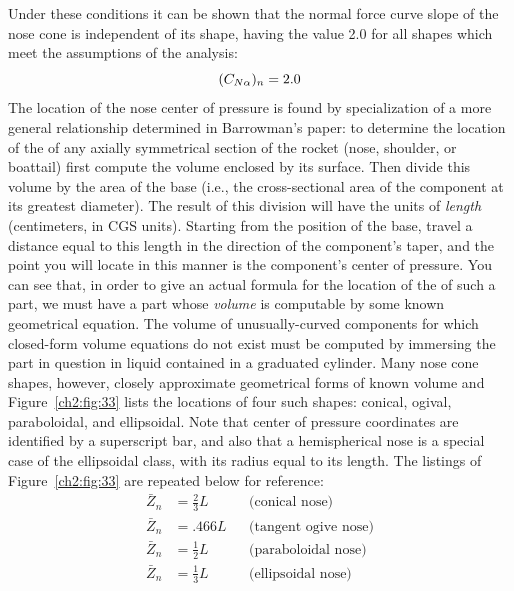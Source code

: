 Under these conditions it can be shown that the normal force curve slope of
the nose cone is independent of its shape, having the value 2.0 for all
shapes which meet the assumptions of the analysis:
\begin{equation}\label{ch2:eq:79}
(C_{N\alpha})_n = 2.0
\end{equation}
The location of the nose center of pressure is found by specialization of a
more general relationship determined in Barrowman's paper: to determine the
location of the \CP{} of any axially symmetrical section of the rocket
(nose, shoulder, or boattail) first compute the volume enclosed by its
surface. Then divide this volume by the area of the base (i.e., the
cross-sectional area of the component at its greatest diameter). The result
of this division will have the units of \emph{length} (centimeters, in CGS
units). Starting from the position of the base, travel a distance equal to
this length in the direction of the component's taper, and the point you
will locate in this manner is the component's center of pressure. You can
see that, in order to give an actual formula for the location of the \CP{}
of such a part, we must have a part whose \emph{volume} is computable by
some known geometrical equation. The volume of unusually-curved components
for which closed-form volume equations do not exist must be computed by
immersing the part in question in liquid contained in a graduated cylinder.
Many nose cone shapes, however, closely approximate geometrical forms of
known volume and Figure~\ref{ch2:fig:33} lists the \CP{} locations of four
such shapes: conical, ogival, paraboloidal, and ellipsoidal. Note that
center of pressure coordinates are identified by a superscript bar, and also
that a hemispherical nose is a special case of the ellipsoidal class, with
its radius equal to its length. The listings of Figure~\ref{ch2:fig:33} are
repeated below for reference:
\begin{subequations}\label{ch2:eq:80}
\begin{align}
\bar{Z}_n &= \tfrac{2}{3}L & &\text{(conical nose)} \label{ch2:eq:80a}\\
\bar{Z}_n &= .466L & &\text{(tangent ogive nose)} \label{ch2:eq:80b}\\
\bar{Z}_n &= \tfrac{1}{2}L & &\text{(paraboloidal nose)} \label{ch2:eq:80c}\\
\bar{Z}_n &= \tfrac{1}{3}L & &\text{(ellipsoidal nose)} \label{ch2:eq:80d}
\end{align}
\end{subequations}

